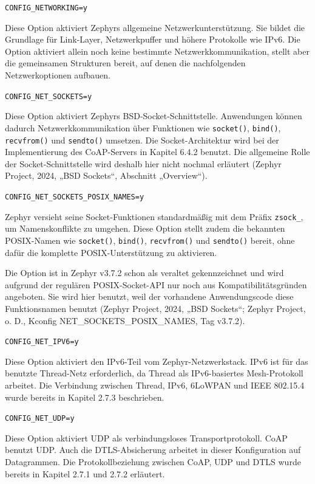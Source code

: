 \lstinline[style=fileinline]|CONFIG_NETWORKING=y|

Diese Option aktiviert Zephyrs allgemeine Netzwerkunterstützung. Sie bildet die Grundlage für Link-Layer, Netzwerkpuffer und höhere Protokolle wie IPv6. Die Option aktiviert allein noch keine bestimmte Netzwerkkommunikation, stellt aber die gemeinsamen Strukturen bereit, auf denen die nachfolgenden Netzwerkoptionen aufbauen.

\lstinline[style=fileinline]|CONFIG_NET_SOCKETS=y|

Diese Option aktiviert Zephyrs BSD-Socket-Schnittstelle. Anwendungen können dadurch Netzwerkkommunikation über Funktionen wie \lstinline[style=fileinline]|socket()|, \lstinline[style=fileinline]|bind()|, \lstinline[style=fileinline]|recvfrom()| und \lstinline[style=fileinline]|sendto()| umsetzen. Die Socket-Architektur wird bei der Implementierung des CoAP-Servers in Kapitel 6.4.2 benutzt. Die allgemeine Rolle der Socket-Schnittstelle wird deshalb hier nicht nochmal erläutert (Zephyr Project, 2024, „BSD Sockets“, Abschnitt „Overview“).

\lstinline[style=fileinline]|CONFIG_NET_SOCKETS_POSIX_NAMES=y|

Zephyr versieht seine Socket-Funktionen standardmäßig mit dem Präfix \lstinline[style=fileinline]|zsock_|, um Namenskonflikte zu umgehen. Diese Option stellt zudem die bekannten POSIX-Namen wie \lstinline[style=fileinline]|socket()|, \lstinline[style=fileinline]|bind()|, \lstinline[style=fileinline]|recvfrom()| und \lstinline[style=fileinline]|sendto()| bereit, ohne dafür die komplette POSIX-Unterstützung zu aktivieren.

Die Option ist in Zephyr v3.7.2 schon als veraltet gekennzeichnet und wird aufgrund der regulären POSIX-Socket-API nur noch aus Kompatibilitätsgründen angeboten. Sie wird hier benutzt, weil der vorhandene Anwendungscode diese Funktionsnamen benutzt (Zephyr Project, 2024, „BSD Sockets“; Zephyr Project, o. D., Kconfig NET\_SOCKETS\_POSIX\_NAMES, Tag v3.7.2).

\lstinline[style=fileinline]|CONFIG_NET_IPV6=y|

Diese Option aktiviert den IPv6-Teil vom Zephyr-Netzwerkstack. IPv6 ist für das benutzte Thread-Netz erforderlich, da Thread als IPv6-basiertes Mesh-Protokoll arbeitet. Die Verbindung zwischen Thread, IPv6, 6LoWPAN und IEEE 802.15.4 wurde bereits in Kapitel 2.7.3 beschrieben.

\lstinline[style=fileinline]|CONFIG_NET_UDP=y|

Diese Option aktiviert UDP als verbindungsloses Transportprotokoll. CoAP benutzt UDP. Auch die DTLS-Absicherung arbeitet in dieser Konfiguration auf Datagrammen. Die Protokollbeziehung zwischen CoAP, UDP und DTLS wurde bereits in Kapitel 2.7.1 und 2.7.2 erläutert.

